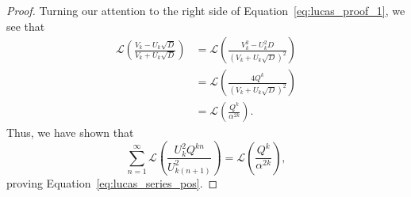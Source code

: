 \documentclass[10pt]{article}
\theoremstyle{definition}
\begin{document}
\begin{proof}
    Turning our attention to the right side of Equation~\eqref{eq:lucas_proof_1}, we see that 
    \begin{align*}
        \mathcal{L}\left(\frac{V_k-U_k \sqrt{D}}{V_k+U_k\sqrt{D}}\right) &= \mathcal{L}\left(\frac{V^2_k-U^2_k D}{(V_k+U_k\sqrt{D})^2}\right) \\
        &= \mathcal{L}\left(\frac{4Q^k}{(V_k+U_k\sqrt{D})^2}\right) \\
        &= \mathcal{L}\left(\frac{Q^k}{\alpha^{2k}}\right).
    \end{align*}
    Thus, we have shown that
    \begin{equation*}
        \sum_{n=1}^{\infty}\mathcal{L}\left(\frac{U^2_k Q^{kn}}{U^2_{k(n+1)}}\right)  = \mathcal{L}\left(\frac{Q^k}{\alpha^{2k}}\right),
    \end{equation*}
   proving Equation~\eqref{eq:lucas_series_pos}.
   

\end{proof}
\end{document}
